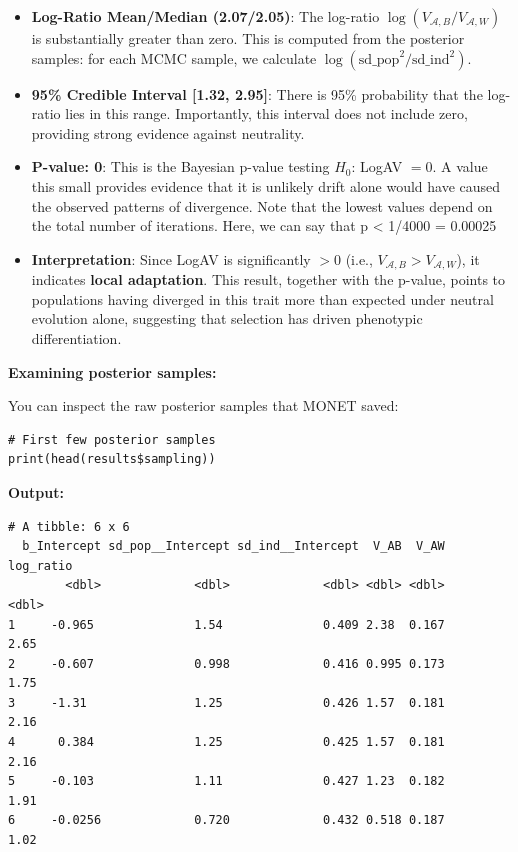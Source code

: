 \documentclass[11pt]{article}
\begin{document}
\begin{itemize}
\item \textbf{Log-Ratio Mean/Median (2.07/2.05)}: The log-ratio $\log(V_{ \mathcal{A},B}/V_{ \mathcal{A},W})$ is substantially greater than zero. This is computed from the posterior samples: for each MCMC sample, we calculate $\log(\text{sd\_pop}^2 / \text{sd\_ind}^2)$.

\item \textbf{95\% Credible Interval [1.32, 2.95]}: There is 95\% probability that the log-ratio lies in this range. Importantly, this interval does not include zero, providing strong evidence against neutrality.

\item \textbf{P-value: 0}: This is the Bayesian p-value testing $H_0$: LogAV $= 0$. A value this small provides evidence that it is unlikely drift alone would have caused the observed patterns of divergence. Note that the lowest values depend on the total number of iterations. Here, we can say that p < 1/4000 = 0.00025

\item \textbf{Interpretation}: Since LogAV is significantly $> 0$ (i.e., $V_{ \mathcal{A},B} > V_{ \mathcal{A},W}$), it indicates \textbf{local adaptation}. This result, together with the p-value, points to populations having diverged in this trait more than expected under neutral evolution alone, suggesting that selection has driven phenotypic differentiation.
\end{itemize}

\textbf{Examining posterior samples:}

You can inspect the raw posterior samples that MONET saved:

\begin{lstlisting}
# First few posterior samples
print(head(results$sampling))
\end{lstlisting}

\textbf{Output:}
\begin{verbatim}
# A tibble: 6 x 6
  b_Intercept sd_pop__Intercept sd_ind__Intercept  V_AB  V_AW log_ratio
        <dbl>             <dbl>             <dbl> <dbl> <dbl>     <dbl>
1     -0.965              1.54              0.409 2.38  0.167      2.65
2     -0.607              0.998             0.416 0.995 0.173      1.75
3     -1.31               1.25              0.426 1.57  0.181      2.16
4      0.384              1.25              0.425 1.57  0.181      2.16
5     -0.103              1.11              0.427 1.23  0.182      1.91
6     -0.0256             0.720             0.432 0.518 0.187      1.02
\end{verbatim}
\end{document}
